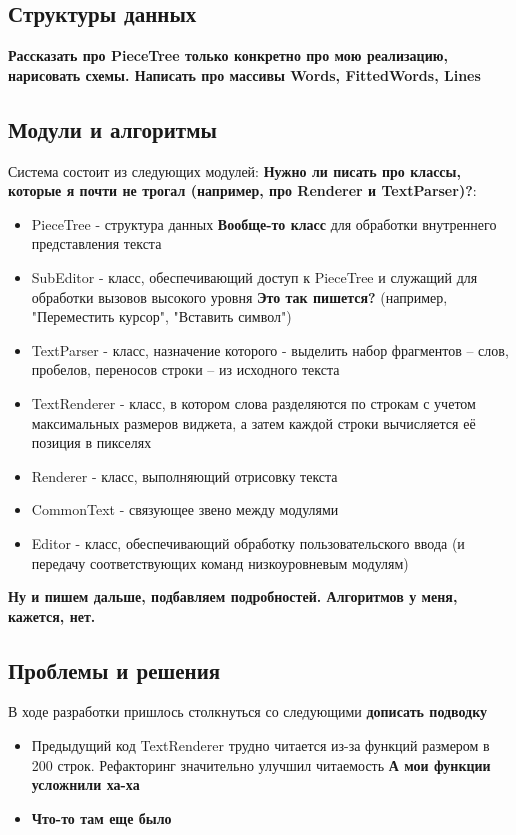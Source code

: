 \documentclass{fefu}
\begin{document}
		\subsection{Структуры данных}
			\textbf{Рассказать про PieceTree только конкретно про мою реализацию, нарисовать 
			схемы. Написать про массивы Words, FittedWords, Lines}
		\subsection{Модули и алгоритмы}
		\par Система состоит из следующих модулей: \textbf{Нужно ли писать про классы, которые я почти не 
		трогал (например, про Renderer и TextParser)?}:
		\begin{itemize}
			\item PieceTree - структура данных \textbf{Вообще-то класс} для обработки 
			внутреннего представления текста
			\item SubEditor - класс, обеспечивающий доступ к PieceTree и служащий для 
			обработки вызовов высокого уровня \textbf{Это так пишется?} (например, 
			"Переместить курсор", "Вставить символ")
			\item TextParser - класс, назначение которого - выделить набор фрагментов -- слов, 
			пробелов, переносов строки -- из исходного текста
			\item TextRenderer - класс, в котором слова разделяются по строкам с учетом 
			максимальных размеров виджета, а затем каждой строки вычисляется её позиция 
			в пикселях
			\item Renderer - класс, выполняющий отрисовку текста
			\item CommonText - связующее звено между модулями
			\item Editor - класс, обеспечивающий обработку пользовательского ввода (и 
			передачу соответствующих команд низкоуровневым модулям)
		\end{itemize}
		\textbf{Ну и пишем дальше, подбавляем подробностей. Алгоритмов у меня, кажется, нет.}
		\subsection{Проблемы и решения}
			\par В ходе разработки пришлось столкнуться со следующими \textbf{дописать 
			подводку}
			\begin{itemize}
				\item Предыдущий код TextRenderer трудно читается из-за функций размером в
				200 строк. Рефакторинг значительно улучшил читаемость \textbf{А мои функции 
				усложнили ха-ха}
				\item \textbf{Что-то там еще было}
			\end{itemize}
\end{document}
